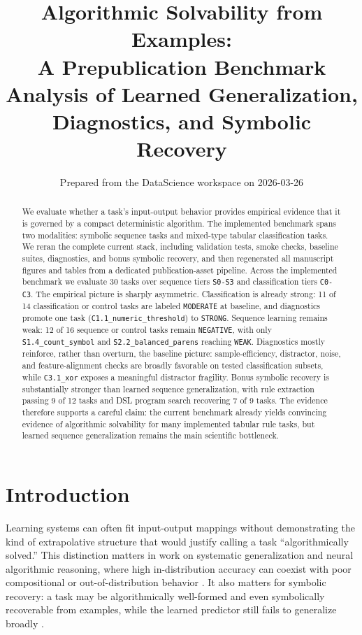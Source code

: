 \documentclass[11pt]{article}
\title{Algorithmic Solvability from Examples:\\A Prepublication Benchmark Analysis of Learned Generalization, Diagnostics, and Symbolic Recovery}
\author{Prepared from the DataScience workspace on 2026-03-26}
\date{}
\begin{document}
\maketitle

\begin{abstract}
We evaluate whether a task's input-output behavior provides empirical evidence that it is governed by a compact deterministic algorithm. The implemented benchmark spans two modalities: symbolic sequence tasks and mixed-type tabular classification tasks. We reran the complete current stack, including validation tests, smoke checks, baseline suites, diagnostics, and bonus symbolic recovery, and then regenerated all manuscript figures and tables from a dedicated publication-asset pipeline. Across the implemented benchmark we evaluate 30 tasks over sequence tiers \texttt{S0-S3} and classification tiers \texttt{C0-C3}. The empirical picture is sharply asymmetric. Classification is already strong: 11 of 14 classification or control tasks are labeled \texttt{MODERATE} at baseline, and diagnostics promote one task (\texttt{C1.1\_numeric\_threshold}) to \texttt{STRONG}. Sequence learning remains weak: 12 of 16 sequence or control tasks remain \texttt{NEGATIVE}, with only \texttt{S1.4\_count\_symbol} and \texttt{S2.2\_balanced\_parens} reaching \texttt{WEAK}. Diagnostics mostly reinforce, rather than overturn, the baseline picture: sample-efficiency, distractor, noise, and feature-alignment checks are broadly favorable on tested classification subsets, while \texttt{C3.1\_xor} exposes a meaningful distractor fragility. Bonus symbolic recovery is substantially stronger than learned sequence generalization, with rule extraction passing 9 of 12 tasks and DSL program search recovering 7 of 9 tasks. The evidence therefore supports a careful claim: the current benchmark already yields convincing evidence of algorithmic solvability for many implemented tabular rule tasks, but learned sequence generalization remains the main scientific bottleneck.
\end{abstract}

\section{Introduction}

Learning systems can often fit input-output mappings without demonstrating the kind of extrapolative structure that would justify calling a task ``algorithmically solved.'' This distinction matters in work on systematic generalization and neural algorithmic reasoning, where high in-distribution accuracy can coexist with poor compositional or out-of-distribution behavior \cite{lake2018scan,kim2020cogs,velickovic2022clrs}. It also matters for symbolic recovery: a task may be algorithmically well-formed and even symbolically recoverable from examples, while the learned predictor still fails to generalize broadly \cite{balog2017deepcoder}.
\end{document}
